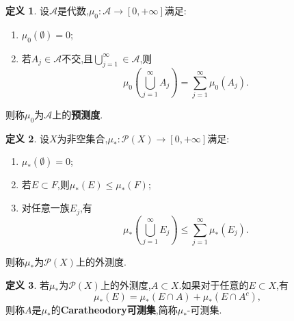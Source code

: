 \documentclass{ctexart}
\theoremstyle{definition}
\newtheorem{definition}{定义}
\theoremstyle{remark}
\begin{document}
	\begin{definition}
		设$\mathcal{A}$是代数,$\mu_0:\mathcal{A}\to[0,+\infty]$满足:
		\begin{enumerate}
			\item $\mu_0(\emptyset)=0$;
			\item 若$A_j\in\mathcal{A}$不交,且$\bigcup_{j=1}^\infty\in\mathcal{A}$,则
			$$\mu_0\left(\bigcup_{j=1}^\infty{A_j}\right)=\sum_{j=1}^\infty{\mu_0(A_j)}.$$
		\end{enumerate}
		则称$\mu_0$为$\mathcal{A}$上的\textbf{预测度}.
	\end{definition}
	
	\begin{definition}
		设$X$为非空集合,$\mu_*:\mathcal{P}(X)\to[0,+\infty]$满足:
		\begin{enumerate}
			\item $\mu_*(\emptyset)=0$;
			\item 若$E\subset F$,则$\mu_*(E)\le\mu_*(F)$;
			\item 对任意一族$E_j$,有
			$$\mu_*\left(\bigcup_{j=1}^\infty{E_j}\right)\le\sum_{j=1}^\infty{\mu_*(E_j)}.$$
		\end{enumerate}
		则称$\mu_*$为$\mathcal{P}(X)$上的外测度.
	\end{definition}
	
	\begin{definition}
		若$\mu_*$为$\mathcal{P}(X)$上的外测度,$A\subset X$.如果对于任意的$E\subset X$,有
		$$\mu_*(E)=\mu_*(E\cap A)+\mu_*(E\cap A^c),$$
		则称$A$是$\mu_*$的\textbf{Caratheodory可测集},简称$\mu_*$-可测集.
	\end{definition}
	
\end{document}
